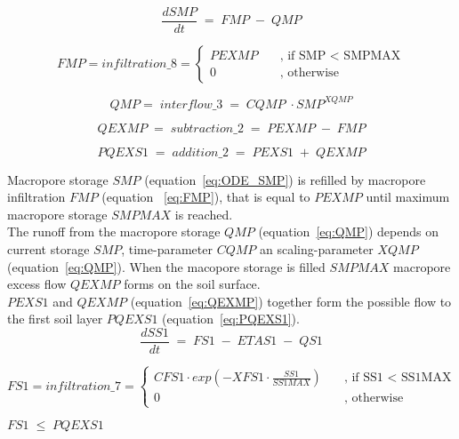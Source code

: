 \documentclass[11pt,color]{tudbook}
\begin{document}
\begin{onehalfspacing}
\begin{equation}
\label{eq:ODE_SMP}
\frac{dSMP}{dt}\;=\;FMP\;-\;QMP
\end{equation}

\begin{equation}
\label{eq:FMP}
 FMP = infiltration\_8 = 
\begin{cases}
    PEXMP & \quad \text{, if SMP < SMPMAX}  \\
    0     & \quad \text{, otherwise }
  \end{cases}
\end{equation}

\begin{equation}
\label{eq:QMP}
QMP =\;interflow\_3\;=\;CQMP\;\cdot SMP^{XQMP}
\end{equation}


\begin{equation}
\label{eq:QEXMP}
QEXMP\;=\;subtraction\_2\;=\;PEXMP\;-\;FMP
\end{equation}

\begin{equation}
\label{eq:PQEXS1}
PQEXS1\;=\;addition\_2\;=\;PEXS1\;+\;QEXMP
\end{equation}

Macropore storage $SMP$ (equation~\ref{eq:ODE_SMP}) is refilled by macropore infiltration $FMP$ (equation~ \ref{eq:FMP}), that is equal to $PEXMP$ until maximum macropore storage $SMPMAX$ is reached.\\
The runoff from the macropore storage $QMP$ (equation~\ref{eq:QMP}) depends on current storage $SMP$, time-parameter $CQMP$ an scaling-parameter $XQMP$ (equation~\ref{eq:QMP}). 
When the macopore storage is filled $SMPMAX$ macropore excess flow $QEXMP$ forms on the soil surface.\\
$PEXS1$ and $QEXMP$ (equation~\ref{eq:QEXMP}) together form the possible flow to the first soil layer  $PQEXS1$ (equation~\ref{eq:PQEXS1}).\\



\begin{equation}
\label{eq:ODE_SS1}
\frac{dSS1}{dt}\;=\;FS1\;-\;ETAS1\;-\;QS1
\end{equation}

\begin{equation}
\label{eq:FS1}
 FS1 = infiltration\_7 = 
\begin{cases}
    CFS1 \cdot exp \left( - XFS1 \cdot \frac{SS1}{SS1MAX}\right) & \quad \text{, if SS1 < SS1MAX}  \\
    0     & \quad \text{, otherwise}
  \end{cases}
\end{equation}
\begin{center}
$FS1\;\leq\;PQEXS1$
\end{center}


\end{onehalfspacing}
\end{document}
